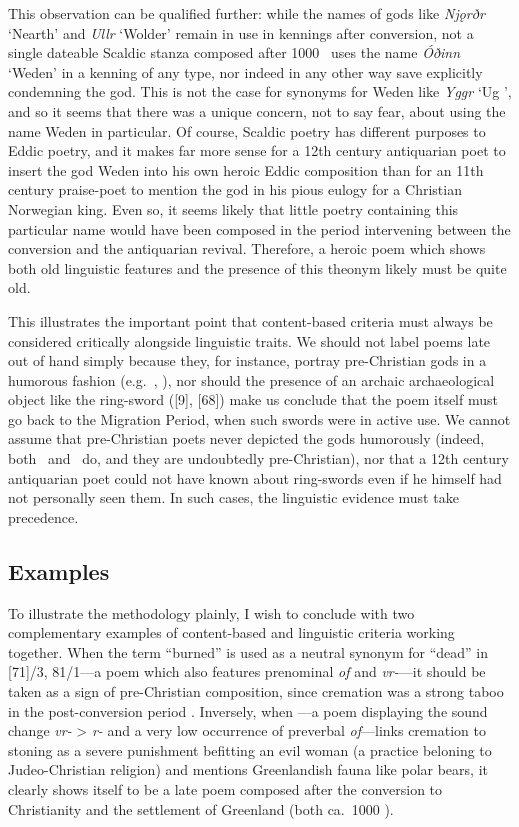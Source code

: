 This observation can be qualified further: while the names of gods like \emph{Njǫrðr} ‘Nearth’ and \emph{Ullr} ‘Wolder’ remain in use in kennings after conversion, not a single dateable Scaldic stanza composed after 1000 \ce\ uses the name \emph{Óðinn} ‘Weden’ in a kenning of any type, nor indeed in any other way save explicitly condemning the god.  This is not the case for synonyms for Weden like \emph{Yggr} ‘Ug ’, and so it seems that there was a unique concern, not to say fear, about using the name Weden in particular.
Of course, Scaldic poetry has different purposes to Eddic poetry, and it makes far more sense for a 12th century antiquarian poet to insert the god Weden into his own heroic Eddic composition than for an 11th century praise-poet to mention the god in his pious eulogy for a Christian Norwegian king.  Even so, it seems likely that little poetry containing this particular name would have been composed in the period intervening between the conversion and the antiquarian revival.  Therefore, a heroic poem which shows both old linguistic features and the presence of this theonym likely must be quite old.

This illustrates the important point that content-based criteria must always be considered critically alongside linguistic traits.  We should not label poems late out of hand simply because they, for instance, portray pre-Christian gods in a humorous fashion (e.g.~, ), nor should the presence of an archaic archaeological object like the ring-sword ([9], [68]) make us conclude that the poem itself must go back to the Migration Period, when such swords were in active use.  We cannot assume that pre-Christian poets never depicted the gods humorously (indeed, both \Iliad\ and \Rigveda\ do, and they are undoubtedly pre-Christian), nor that a 12th century antiquarian poet could not have known about ring-swords even if he himself had not personally seen them.  In such cases, the linguistic evidence must take precedence.

\subsection{Examples}

To illustrate the methodology plainly, I wish to conclude with two complementary examples of content-based and linguistic criteria working together.  When the term “burned” is used as a neutral synonym for “dead” in [71]/3, 81/1---a poem which also features prenominal \emph{of} and \emph{vr-}---it should be taken as a sign of pre-Christian composition, since cremation was a strong taboo in the post-conversion period \parencite[93--96]{Males2024Hav}.  Inversely, when ---a poem displaying the sound change \emph{vr-} > \emph{r-} and a very low occurrence of preverbal \emph{of}---links cremation to stoning as a severe punishment befitting an evil woman (a practice beloning to Judeo-Christian religion) and mentions Greenlandish fauna like polar bears, it clearly shows itself to be a late poem composed after the conversion to Christianity and the settlement of Greenland (both ca.~1000 \ce).

